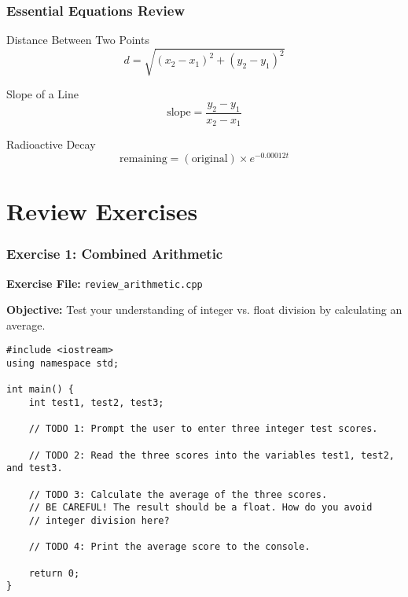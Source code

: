 \documentclass{beamer}
\begin{document}
\begin{frame}
\frametitle{Essential Equations Review}
\begin{block}{Distance Between Two Points}
$$ d = \sqrt{(x_2 - x_1)^2 + (y_2 - y_1)^2} $$
\end{block}
\pause
\begin{block}{Slope of a Line}
$$ \text{slope} = \frac{y_2 - y_1}{x_2 - x_1} $$
\end{block}
\pause
\begin{block}{Radioactive Decay}
$$ \text{remaining} = (\text{original}) \times e^{-0.00012t} $$
\end{block}
\end{frame}

\section{Review Exercises}

\begin{frame}[fragile]
\frametitle{Exercise 1: Combined Arithmetic}
\textbf{Exercise File:} \texttt{review_arithmetic.cpp}\pause

\textbf{Objective:} Test your understanding of integer vs. float division by calculating an average.\pause

\begin{verbatim}
#include <iostream>
using namespace std;

int main() {
    int test1, test2, test3;

    // TODO 1: Prompt the user to enter three integer test scores.
    
    // TODO 2: Read the three scores into the variables test1, test2, and test3.
    
    // TODO 3: Calculate the average of the three scores.
    // BE CAREFUL! The result should be a float. How do you avoid
    // integer division here?
    
    // TODO 4: Print the average score to the console.

    return 0;
}
\end{verbatim}
\end{frame}
\end{document}
